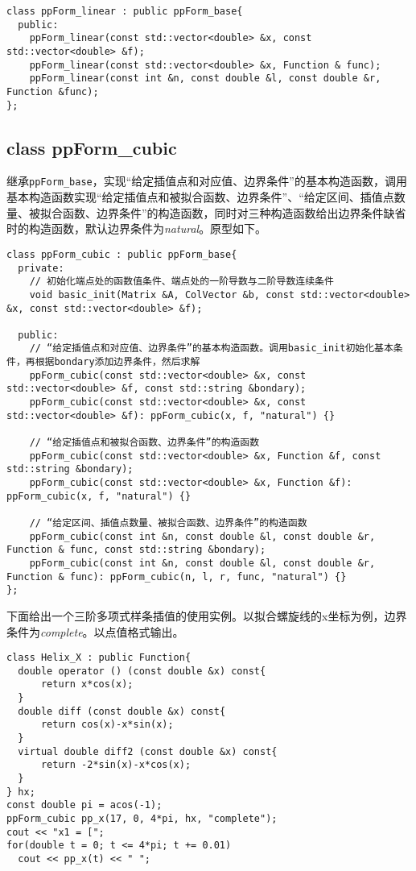 \documentclass[lang=cn,11pt,a4paper]{elegantpaper}
\begin{document}
\begin{lstlisting}
class ppForm_linear : public ppForm_base{
  public:
    ppForm_linear(const std::vector<double> &x, const std::vector<double> &f);
    ppForm_linear(const std::vector<double> &x, Function & func);
    ppForm_linear(const int &n, const double &l, const double &r, Function &func);
};
\end{lstlisting}

\subsection{class ppForm\_cubic}

继承\verb|ppForm_base|，实现“给定插值点和对应值、边界条件”的基本构造函数，调用基本构造函数实现“给定插值点和被拟合函数、边界条件”、“给定区间、插值点数量、被拟合函数、边界条件”的构造函数，同时对三种构造函数给出边界条件缺省时的构造函数，默认边界条件为\textit{natural}。原型如下。

\begin{lstlisting}
class ppForm_cubic : public ppForm_base{
  private:
    // 初始化端点处的函数值条件、端点处的一阶导数与二阶导数连续条件
    void basic_init(Matrix &A, ColVector &b, const std::vector<double> &x, const std::vector<double> &f);

  public:
    // “给定插值点和对应值、边界条件”的基本构造函数。调用basic_init初始化基本条件，再根据bondary添加边界条件，然后求解
    ppForm_cubic(const std::vector<double> &x, const std::vector<double> &f, const std::string &bondary);
    ppForm_cubic(const std::vector<double> &x, const std::vector<double> &f): ppForm_cubic(x, f, "natural") {}

    // “给定插值点和被拟合函数、边界条件”的构造函数
    ppForm_cubic(const std::vector<double> &x, Function &f, const std::string &bondary);
    ppForm_cubic(const std::vector<double> &x, Function &f): ppForm_cubic(x, f, "natural") {}

    // “给定区间、插值点数量、被拟合函数、边界条件”的构造函数
    ppForm_cubic(const int &n, const double &l, const double &r, Function & func, const std::string &bondary);
    ppForm_cubic(const int &n, const double &l, const double &r, Function & func): ppForm_cubic(n, l, r, func, "natural") {}
};
\end{lstlisting}

下面给出一个三阶多项式样条插值的使用实例。以拟合螺旋线的x坐标为例，边界条件为\textit{complete}。以点值格式输出。

\begin{lstlisting}
class Helix_X : public Function{
  double operator () (const double &x) const{
      return x*cos(x);
  }
  double diff (const double &x) const{
      return cos(x)-x*sin(x);
  }
  virtual double diff2 (const double &x) const{
      return -2*sin(x)-x*cos(x);
  }
} hx;
const double pi = acos(-1);
ppForm_cubic pp_x(17, 0, 4*pi, hx, "complete");
cout << "x1 = [";
for(double t = 0; t <= 4*pi; t += 0.01)
  cout << pp_x(t) << " ";
\end{lstlisting}
\end{document}
